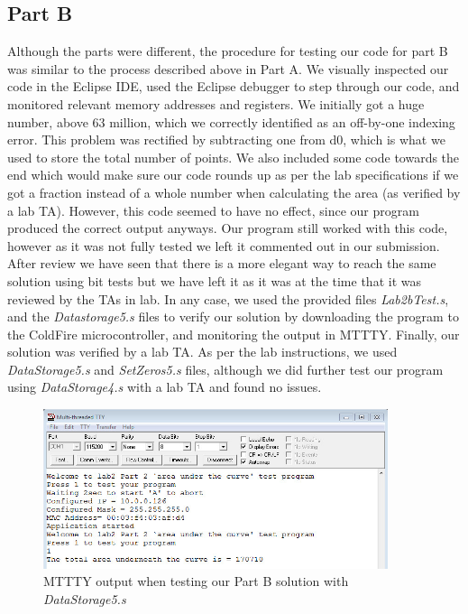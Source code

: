 \documentclass[letterpaper]{article}
\begin{document}
  \subsection{Part B}
    Although the parts were different, the procedure for testing our code for
    part B was similar to the process described above in Part A. We visually
    inspected our code in the Eclipse IDE, used the Eclipse debugger to step
    through our code, and monitored relevant memory addresses and registers. We
    initially got a huge number, above 63 million, which we correctly identified
    as an off-by-one indexing error. This problem was rectified by subtracting
    one from d0, which is what we used to store the total number of points. We
    also included some code towards the end which  would make sure our code
    rounds up as per the lab specifications if we got a fraction instead of a
    whole number when calculating the area (as verified by a lab TA). However,
    this code seemed to have no effect, since our program produced the correct
    output anyways. Our program still worked with this code, however as it was not
    fully tested we left it commented out in our submission. After review we have
    seen that there is a more elegant way to reach the same solution using bit tests
    but we have left it as it was at the time that it was reviewed by the TAs in lab.
    In any case, we used the provided files \textit{Lab2bTest.s}, and the
    \textit{Datastorage5.s} files to verify our solution by downloading the
    program to the ColdFire microcontroller, and monitoring the output in MTTTY.
    Finally, our solution was verified by a lab TA. As per the lab instructions,
    we used \textit{DataStorage5.s} and \textit{SetZeros5.s} files, although we
    did further test our program using \textit{DataStorage4.s} with a lab TA and
    found no issues.



    \begin{figure}[H]
      \centering
      \includegraphics[width=0.9\textwidth]{part2ds5.jpg}
      \caption{MTTTY output when testing our Part B solution with \textit{DataStorage5.s}}
    \end{figure}
\end{document}
